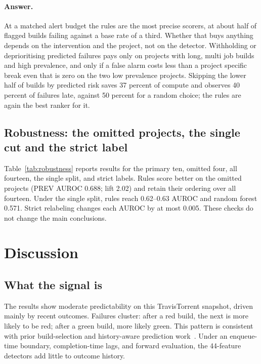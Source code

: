 \documentclass[sigconf,review,anonymous,nonacm]{acmart}
\begin{document}
\paragraph{Answer.} At a matched alert budget the rules are the most precise scorers, at about half of flagged builds failing against a base rate of a third. Whether that buys anything depends on the intervention and the project, not on the detector. Withholding or deprioritising predicted failures pays only on projects with long, multi job builds and high prevalence, and only if a false alarm costs less than a project specific break even that is zero on the two low prevalence projects. Skipping the lower half of builds by predicted risk saves 37 percent of compute and observes 40 percent of failures late, against 50 percent for a random choice; the rules are again the best ranker for it.

\subsection{Robustness: the omitted projects, the single cut and the strict label}
\label{sec:results-robustness}





Table~\ref{tab:robustness} reports results for the primary ten, omitted four, all fourteen, the single split, and strict labels. Rules score better on the omitted projects (PREV AUROC 0.688; lift 2.02) and retain their ordering over all fourteen. Under the single split, rules reach 0.62--0.63 AUROC and random forest 0.571. Strict relabeling changes each AUROC by at most 0.005. These checks do not change the main conclusions.

\section{Discussion}
\label{sec:discussion}

\subsection{What the signal is}
\label{sec:discussion-signal}

The results show moderate predictability on this TravisTorrent snapshot, driven mainly by recent outcomes. Failures cluster: after a red build, the next is more likely to be red; after a green build, more likely green. This pattern is consistent with prior build-selection and history-aware prediction work~\cite{jin2020, jin2022, nili2017, chen2020buildfast}. Under an enqueue-time boundary, completion-time lags, and forward evaluation, the 44-feature detectors add little to outcome history.
\end{document}
